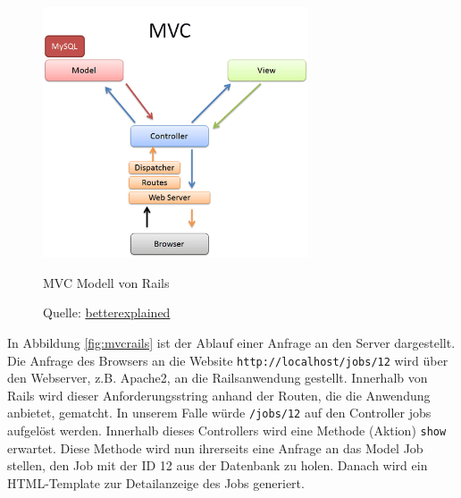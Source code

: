  \begin{figure}[h]
  \centering
  \includegraphics[width=0.7\textwidth]{./material/mvc-rails.png}
  \caption{MVC Modell von Rails}
  \caption*{Quelle: \href{http://betterexplained.com/articles/intermediate-rails-understanding-models-views-and-controllers/}{betterexplained}}
\end{figure}
In Abbildung \ref{fig:mvcrails} ist der Ablauf einer Anfrage an den Server dargestellt. Die Anfrage des Browsers an die Website \texttt{http://localhost/jobs/12} wird über den Webserver, z.B. Apache2, an die Railsanwendung gestellt. Innerhalb von Rails wird dieser Anforderungsstring anhand der Routen, die die Anwendung anbietet, gematcht. In unserem Falle würde \texttt{/jobs/12} auf den Controller jobs aufgelöst werden. Innerhalb dieses Controllers wird eine Methode (Aktion) \texttt{show} erwartet.
Diese Methode wird nun ihrerseits eine Anfrage an das Model Job stellen, den Job mit der ID 12 aus der Datenbank zu holen. Danach wird ein HTML-Template zur Detailanzeige des Jobs generiert.


